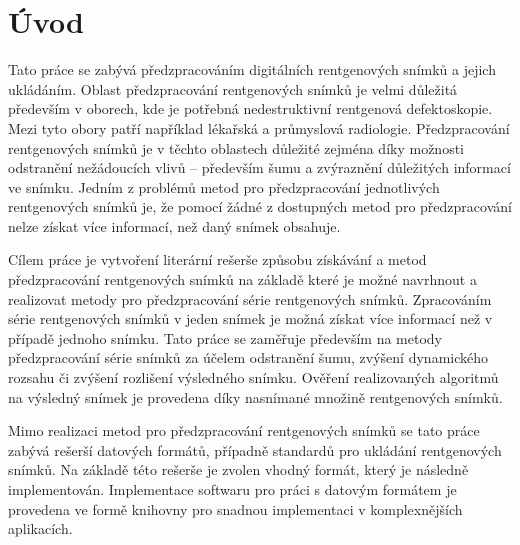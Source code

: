 \chapter*{Úvod} 
{} 
Tato práce se zabývá předzpracováním digitálních rentgenových snímků a jejich ukládáním. Oblast předzpracování rentgenových snímků je velmi důležitá především v oborech, kde je potřebná nedestruktivní rentgenová defektoskopie. Mezi tyto obory patří například lékařská a průmyslová radiologie. Předzpracování rentgenových snímků je v těchto oblastech důležité zejména díky možnosti odstranění nežádoucích vlivů -- především šumu a zvýraznění důležitých informací ve snímku. Jedním z problémů metod pro předzpracování jednotlivých rentgenových snímků je, že pomocí žádné z dostupných metod pro předzpracování nelze získat více informací, než daný snímek obsahuje.

Cílem práce je vytvoření literární rešerše způsobu získávání a metod předzpracování rentgenových snímků na základě které je možné navrhnout a realizovat metody pro předzpracování série rentgenových snímků. Zpracováním série rentgenových snímků v jeden snímek je možná získat více informací než v případě jednoho snímku. Tato práce se zaměřuje především na metody předzpracování série snímků za účelem odstranění šumu, zvýšení dynamického rozsahu či zvýšení rozlišení výsledného snímku. Ověření realizovaných algoritmů na výsledný snímek je provedena díky nasnímané množině rentgenových snímků.

Mimo realizaci metod pro předzpracování rentgenových snímků se tato práce zabývá rešerší datových formátů, případně standardů pro ukládání rentgenových snímků. Na základě této rešerše je zvolen vhodný formát, který je následně implementován. Implementace softwaru pro práci s datovým formátem je provedena ve formě knihovny pro snadnou implementaci v komplexnějších aplikacích.